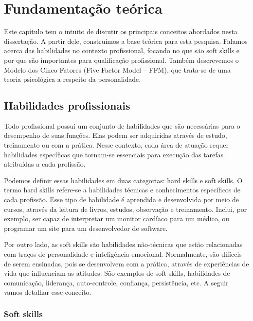 

\chapter{Fundamentação teórica}

\label{chap:theorical}

Este capítulo tem o intuito de discutir os principais conceitos abordados nesta dissertação. A partir dele, construímos a base teórica para esta pesquisa. Falamos acerca das habilidades no contexto profissional, focando no que são soft skills e por que são importantes para qualificação profissional. Também descrevemos o Modelo dos Cinco Fatores (Five Factor Model – FFM), que trata-se de uma teoria psicológica a respeito da personalidade.

\section{Habilidades profissionais}
\label{sec:sskills}

Todo profissional possui um conjunto de habilidades que são necessárias para o desempenho de suas funções. Elas podem ser adquiridas através de estudo, treinamento ou com a prática. Nesse contexto, cada área de atuação requer habilidades específicas que tornam-se essenciais para execução das tarefas atribuídas a cada profissão.

Podemos definir essas habilidades em duas categorias: hard skills e soft skills. O termo hard skills refere-se a habilidades técnicas e conhecimentos específicos de cada profissão. Esse tipo de habilidade é aprendida e desenvolvida por meio de cursos, através da leitura de livros, estudos, observação e treinamento. Inclui, por exemplo, ser capaz de interpretar um monitor cardíaco para um médico, ou programar um site para um desenvolvedor de software.

Por outro lado, as soft skills são habilidades não-técnicas que estão relacionadas com traços de personalidade e inteligência emocional. Normalmente, são difíceis de serem ensinadas, pois se desenvolvem com a prática, através de experiências de vida que influenciam as atitudes. São exemplos de soft skills, habilidades de comunicação, liderança, auto-controle, confiança, persistência, etc. A seguir vamos detalhar esse conceito.

\subsection{Soft skills}
\label{subsec:ss}

